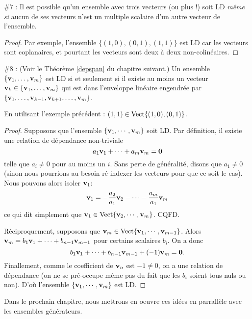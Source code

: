 \begin{fac} \#7 : Il est possible qu'un ensemble avec trois vecteurs (ou plus !) soit LD \emph{même si} aucun de ses vecteurs n'est un multiple scalaire d'un autre vecteur de l'ensemble.\end{fac}

\begin{proof} Par exemple, l'ensemble $\{(1,0), (0,1), (1,1)\}$ est LD car les vecteurs sont coplanaires, et pourtant les vecteurs sont deux \`a deux non-colinéaires. \end{proof}


\begin{fac} \#8 : (Voir le Théorème \ref{depspan} du chapitre suivant.)   
Un ensemble $\{\mathbf{v}_1, \dots, \mathbf{v}_m\}$ est LD si et seulement si il existe au moins
un vecteur $\mathbf{v}_k \in \{\mathbf{v}_1, \dots, \mathbf{v}_m\}$ qui est dans l'enveloppe lin\'eaire engendr\'ee par $\{\mathbf{v}_1, \dots, \mathbf{v}_{k-1}, \mathbf{v}_{k+1}, \dots,\mathbf{v}_m\}$.\end{fac}

\begin{myexample} En utilisant l'exemple pr\'ec\'edent : $(1,1) \in \textrm{Vect}\{(1,0), (0,1)\}$.\end{myexample}


\begin{proof} Supposons que l'ensemble $\{\mathbf{v}_1, \cdots, \mathbf{v}_m\}$ soit LD.  Par définition, il existe
une relation de dépendance non-triviale
$$
a_1\mathbf{v}_1 + \cdots + a_m\mathbf{v}_m = \mathbf{0}
$$
telle que $a_i \neq 0$ pour au moins un $i$.  Sans perte de généralité, disons que $a_1 \neq 0$ (sinon nous pourrions au besoin 
ré-indexer les vecteurs pour que ce soit le cas).  Nous pouvons alors isoler
$\mathbf{v}_1$:
$$
\mathbf{v}_1 = -\frac{a_2}{a_1}\mathbf{v}_2 - \cdots - \frac{a_m}{a_1}\mathbf{v}_m
$$
ce qui dit simplement que $\mathbf{v}_1 \in \textrm{Vect}\{ \mathbf{v}_2, \cdots, \mathbf{v}_m\}$.  CQFD.

R\'eciproquement, supposons que $\mathbf{v}_m \in \textrm{Vect}\{ \mathbf{v}_1, \cdots, \mathbf{v}_{m-1}\}$.
Alors $\mathbf{v}_m = b_1\mathbf{v}_1 + \cdots + b_{n-1}\mathbf{v}_{m-1}$ pour certains scalaires $b_i$.  On a donc
$$
b_1\mathbf{v}_1 + \cdots + b_{n-1}\mathbf{v}_{m-1} + (-1)\mathbf{v}_m = \mathbf{0}.
$$ 
Finallement, comme le coefficient de $\mathbf{v}_n$ est $-1\neq 0$, on a une relation de dépendance  (on ne se pré-occupe même pas du fait que
les $b_i$ soient tous nuls ou non). D'o\`u l'ensemble $\{\mathbf{v}_1, \cdots, \mathbf{v}_m\}$ est LD.
\end{proof}

Dans le prochain chapitre, nous mettrons en oeuvre ces idées en parrall\`ele avec les ensembles g\'en\'erateurs.





